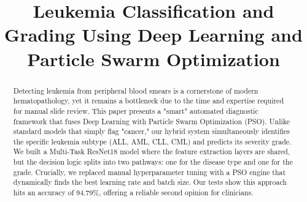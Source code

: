 \documentclass[conference]{IEEEtran}
\begin{document}
\title{Leukemia Classification and Grading Using Deep Learning and Particle Swarm Optimization}

\author{
\and
{}
\and
{}
\and
{}
}

\maketitle

\begin{abstract}
Detecting leukemia from peripheral blood smears is a cornerstone of modern hematopathology, yet it remains a bottleneck due to the time and expertise required for manual slide review. This paper presents a "smart" automated diagnostic framework that fuses Deep Learning with Particle Swarm Optimization (PSO). Unlike standard models that simply flag "cancer," our hybrid system simultaneously identifies the specific leukemia subtype (ALL, AML, CLL, CML) and predicts its severity grade. We built a Multi-Task ResNet18 model where the feature extraction layers are shared, but the decision logic splits into two pathways: one for the disease type and one for the grade. Crucially, we replaced manual hyperparameter tuning with a PSO engine that dynamically finds the best learning rate and batch size. Our tests show this approach hits an accuracy of 94.79\%, offering a reliable second opinion for clinicians.
\end{abstract}
\end{document}
